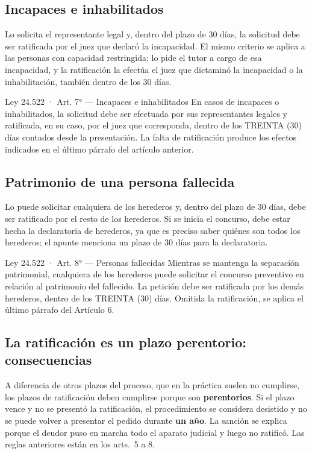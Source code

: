 \documentclass[12pt,oneside]{book}
\begin{document}
\subsection{Incapaces e inhabilitados}

Lo solicita el representante legal y, dentro del plazo de 30 días, la solicitud debe ser ratificada por el juez que declaró la incapacidad. El mismo criterio se aplica a las personas con capacidad restringida: lo pide el tutor a cargo de esa incapacidad, y la ratificación la efectúa el juez que dictaminó la incapacidad o la inhabilitación, también dentro de los 30 días.

\begin{norma}{Ley 24.522 · Art. 7° — Incapaces e inhabilitados}
En casos de incapaces o inhabilitados, la solicitud debe ser efectuada por sus representantes legales y ratificada, en su caso, por el juez que corresponda, dentro de los TREINTA (30) días contados desde la presentación. La falta de ratificación produce los efectos indicados en el último párrafo del artículo anterior.
\end{norma}

\subsection{Patrimonio de una persona fallecida}

Lo puede solicitar cualquiera de los herederos y, dentro del plazo de 30 días, debe ser ratificado por el resto de los herederos. Si se inicia el concurso, debe estar hecha la declaratoria de herederos, ya que es preciso saber quiénes son todos los herederos; el apunte menciona un plazo de 30 días para la declaratoria.

\begin{norma}{Ley 24.522 · Art. 8° — Personas fallecidas}
Mientras se mantenga la separación patrimonial, cualquiera de los herederos puede solicitar el concurso preventivo en relación al patrimonio del fallecido. La petición debe ser ratificada por los demás herederos, dentro de los TREINTA (30) días. Omitida la ratificación, se aplica el último párrafo del Artículo 6.
\end{norma}

\subsection{La ratificación es un plazo perentorio: consecuencias}

A diferencia de otros plazos del proceso, que en la práctica suelen no cumplirse, los plazos de ratificación deben cumplirse porque son \textbf{perentorios}. Si el plazo vence y no se presentó la ratificación, el procedimiento se considera desistido y no se puede volver a presentar el pedido durante \textbf{un año}. La sanción se explica porque el deudor puso en marcha todo el aparato judicial y luego no ratificó. Las reglas anteriores están en los arts.~5 a 8.
\end{document}
